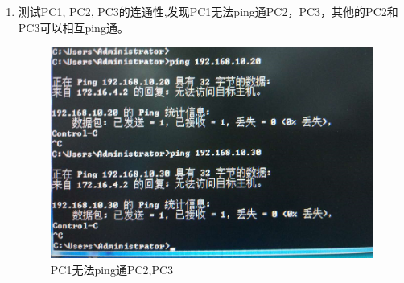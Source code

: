 \documentclass{myreport}
\begin{document}
\begin{enumerate}
    \item 测试PC1, PC2, PC3的连通性,发现PC1无法ping通PC2，PC3，其他的PC2和PC3可以相互ping通。
    \begin{figure}[htp]
        \centering
        \includegraphics[width=13cm]{"./figure/2018-05-17-22-32-57.png"}
        \caption{PC1无法ping通PC2,PC3}
        \label{fig:e2-s2-not-ping}
    \end{figure}
    

\end{enumerate}
\end{document}
